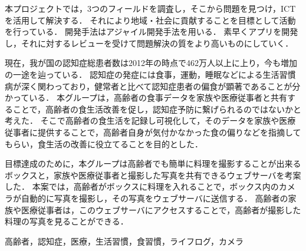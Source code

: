 \documentclass[../report]{subfiles}
\begin{document}
\begin{jabstract}
本プロジェクトでは，3つのフィールドを調査し，そこから問題を見つけ，ICTを活用して解決する．
それにより地域・社会に貢献することを目標として活動を行っている．
開発手法はアジャイル開発手法を用いる．
素早くアプリを開発し，それに対するレビューを受けて問題解決の質をより高いものにしていく．

現在，我が国の認知症総患者数は2012年の時点で462万人以上に上り，今も増加の一途を辿っている．
認知症の発症には食事，運動，睡眠などによる生活習慣病が深く関わっており，健常者と比べて認知症患者の偏食が顕著であることが分かっている．
本グループは，高齢者の食事データを家族や医療従事者と共有することで，高齢者の食生活改善を促し，認知症予防に繋げられるのではないかと考えた．
そこで高齢者の食生活を記録し可視化して，そのデータを家族や医療従事者に提供することで，高齢者自身が気付かなかった食の偏りなどを指摘してもらい，食生活の改善に役立てることを目的とした．

目標達成のために，本グループは高齢者でも簡単に料理を撮影することが出来るボックスと，家族や医療従事者と撮影した写真を共有できるウェブサーバを考案した．
本案では，高齢者がボックスに料理を入れることで，ボックス内のカメラが自動的に写真を撮影し，その写真をウェブサーバに送信する．
高齢者の家族や医療従事者は，このウェブサーバにアクセスすることで，高齢者が撮影した料理の写真を見ることができる．
\begin{jkeyword}
高齢者，認知症，医療，生活習慣，食習慣，ライフログ，カメラ
\end{jkeyword}
\end{jabstract}
\end{document}
